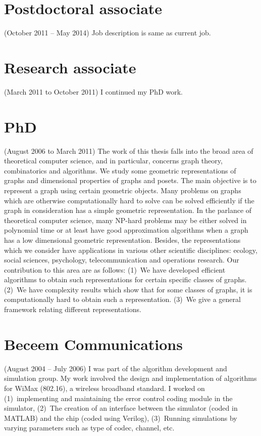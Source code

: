\documentclass[margin,10pt]{res} %
\begin{document}
\begin{resume}
{\section{\textnormal{{Postdoctoral associate}}}\label{sec:postdoc}
(October 2011 -- May 2014) Job description is same as current
job.\smallskip
\section{\textnormal{{Research associate}}}
(March 2011 to October 2011) I continued my PhD work.\smallskip
\section{\textnormal{PhD}}
(August 2006 to March 2011)
The work of this thesis falls into the broad area of theoretical computer
science, and in particular, concerns graph theory, combinatorics and
algorithms. We study some geometric representations of graphs and
dimensional properties of graphs and posets. The main objective is
to represent a graph using certain geometric objects. Many problems
on graphs which are otherwise computationally hard to solve can be
solved efficiently if the graph in consideration has a simple geometric
representation. In the parlance of theoretical computer science, many
NP-hard problems may be either solved in polynomial time or at least
have good approximation algorithms when a graph has a low dimensional
geometric representation. Besides, the representations which we consider
have applications in various other scientific disciplines: ecology,
social sciences, psychology, telecommunication and operations research.
Our contribution to this area are as follows:
(1)~We have developed efficient algorithms to
obtain such representations for certain specific classes of graphs.
(2)~We have complexity results which show that for some classes of graphs, it
is computationally hard to obtain such a representation.
(3)~We give a general framework relating different representations.
\section{\textnormal{Beceem Communications}}\label{sec:beceem}
(August 2004 -- July 2006)
I was part of the algorithm development and simulation group. My
work involved the design and implementation of algorithms for WiMax
(802.16), a wireless broadband standard. I worked on (1)~implementing
and maintaining the error control coding module in the simulator, 
(2)~The creation of an interface between
the simulator (coded in MATLAB) and the chip (coded using Verilog), 
(3)~Running simulations by
varying parameters such as type of codec, channel, etc.
}
\end{resume}
\end{document}
